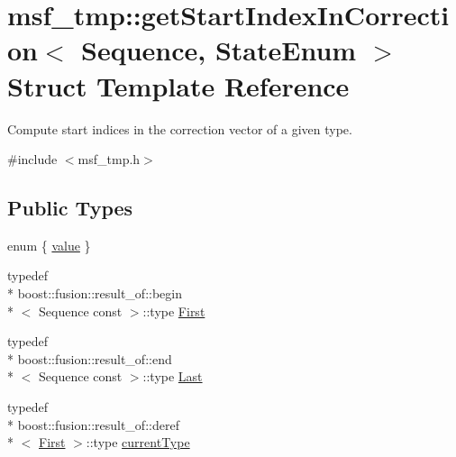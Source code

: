 \hypertarget{structmsf__tmp_1_1getStartIndexInCorrection}{\section{msf\-\_\-tmp\-:\-:get\-Start\-Index\-In\-Correction$<$ Sequence, State\-Enum $>$ Struct Template Reference}
\label{structmsf__tmp_1_1getStartIndexInCorrection}
}


Compute start indices in the correction vector of a given type.  




{\ttfamily \#include $<$msf\-\_\-tmp.\-h$>$}

\subsection*{Public Types}
\begin{DoxyCompactItemize}
\item 
enum \{ \hyperlink{structmsf__tmp_1_1getStartIndexInCorrection_a573f82f852b11b0d055388ec3fb88a60a93a3edb802d7fab36bba5b063ca72f01}{value}
 \}
\item 
typedef \\*
boost\-::fusion\-::result\-\_\-of\-::begin\\*
$<$ Sequence const  $>$\-::type \hyperlink{structmsf__tmp_1_1getStartIndexInCorrection_a531e307897498c39c16887d82684110e}{First}
\item 
typedef \\*
boost\-::fusion\-::result\-\_\-of\-::end\\*
$<$ Sequence const  $>$\-::type \hyperlink{structmsf__tmp_1_1getStartIndexInCorrection_a02451eb845fff7f5c3b22f4fc26a5073}{Last}
\item 
typedef \\*
boost\-::fusion\-::result\-\_\-of\-::deref\\*
$<$ \hyperlink{structmsf__tmp_1_1getStartIndexInCorrection_a531e307897498c39c16887d82684110e}{First} $>$\-::type \hyperlink{structmsf__tmp_1_1getStartIndexInCorrection_a9d81c1d4f8ece8ab37f7086a588ca81d}{current\-Type}
\end{DoxyCompactItemize}


